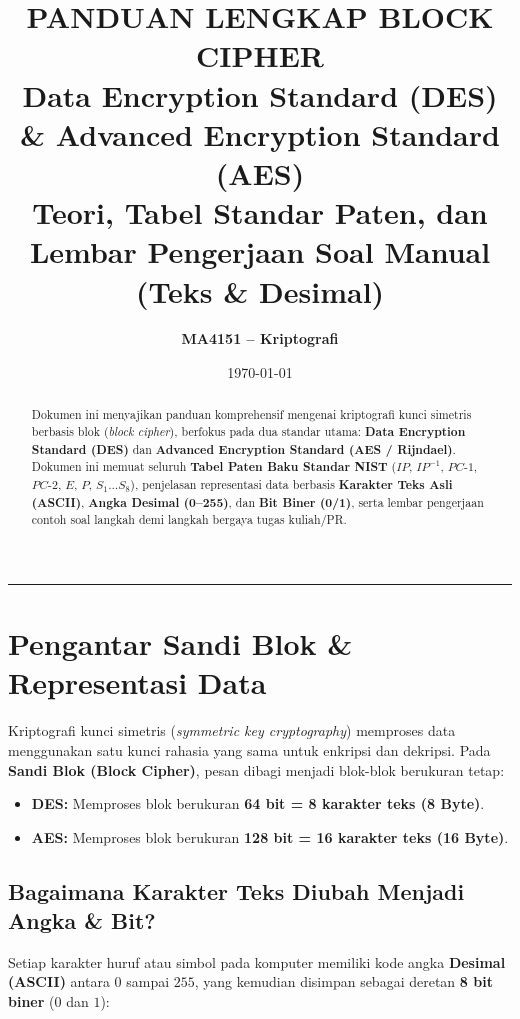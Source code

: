 \documentclass[11pt,a4paper]{article}
\title{
    \vspace{-1cm}
    \textbf{\huge PANDUAN LENGKAP BLOCK CIPHER}\\[0.3cm]
    \textbf{\Large Data Encryption Standard (DES) \& Advanced Encryption Standard (AES)}\\[0.2cm]
    \large Teori, Tabel Standar Paten, dan Lembar Pengerjaan Soal Manual (Teks \& Desimal)
}
\author{\textbf{MA4151 -- Kriptografi}}
\date{\today}
\begin{document}
\maketitle

\begin{abstract}
Dokumen ini menyajikan panduan komprehensif mengenai kriptografi kunci simetris berbasis blok (\textit{block cipher}), berfokus pada dua standar utama: \textbf{Data Encryption Standard (DES)} dan \textbf{Advanced Encryption Standard (AES / Rijndael)}. Dokumen ini memuat seluruh \textbf{Tabel Paten Baku Standar NIST} ($IP$, $IP^{-1}$, $PC\text{-}1$, $PC\text{-}2$, $E$, $P$, $S_1 \dots S_8$), penjelasan representasi data berbasis \textbf{Karakter Teks Asli (ASCII)}, \textbf{Angka Desimal (0--255)}, dan \textbf{Bit Biner (0/1)}, serta lembar pengerjaan contoh soal langkah demi langkah bergaya tugas kuliah/PR.
\end{abstract}

\tableofcontents
\vspace{0.4cm}
\hrule
\vspace{0.4cm}

\section{Pengantar Sandi Blok \& Representasi Data}

Kriptografi kunci simetris (\textit{symmetric key cryptography}) memproses data menggunakan satu kunci rahasia yang sama untuk enkripsi dan dekripsi. Pada \textbf{Sandi Blok (Block Cipher)}, pesan dibagi menjadi blok-blok berukuran tetap:
\begin{itemize}[leftmargin=*]
    \item \textbf{DES:} Memproses blok berukuran \textbf{64 bit = 8 karakter teks (8 Byte)}.
    \item \textbf{AES:} Memproses blok berukuran \textbf{128 bit = 16 karakter teks (16 Byte)}.
\end{itemize}

\subsection{Bagaimana Karakter Teks Diubah Menjadi Angka \& Bit?}
Setiap karakter huruf atau simbol pada komputer memiliki kode angka \textbf{Desimal (ASCII)} antara $0$ sampai $255$, yang kemudian disimpan sebagai deretan \textbf{8 bit biner} ($0$ dan $1$):
\end{document}
